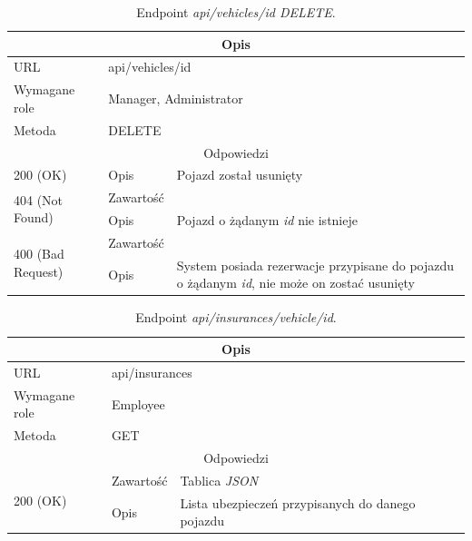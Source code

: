 \documentclass[eng,printmode,openany]{mgr}
\begin{document}
	\begin{table}[H]
		\caption{Endpoint \textit{api/vehicles/id DELETE}.}
		\begin{tabularx}{\textwidth}{|l|l|X|}
			\hline
			\multicolumn{3}{|c|}{Opis}
			\\ \hline
			URL                       & \multicolumn{2}{l|}{api/vehicles/id}
			\\ \hline
			Wymagane role             & \multicolumn{2}{l|}{Manager, Administrator}
			\\ \hline
			Metoda                    & \multicolumn{2}{l|}{DELETE}
			\\ \hline
			\multicolumn{3}{|c|}{Odpowiedzi}
			\\ \hline
			200 (OK)			                & Opis         	& Pojazd został usunięty
			\\ \hline
			\multirow{2}{*}{404 (Not Found)} 	& Zawartość     &    	
			\\ \cline{2-3}                      & Opis          & Pojazd o żądanym \textit{id} nie istnieje
			\\ \hline
			\multirow{2}{*}{400 (Bad Request)} 	& Zawartość     &    	
			\\ \cline{2-3}                      & Opis          & System posiada rezerwacje przypisane do pojazdu o żądanym \textit{id}, nie może on zostać usunięty
			\\ \hline
		\end{tabularx}
	\end{table}
	
	\begin{table}[H]
		\caption{Endpoint \textit{api/insurances/vehicle/id}.}
		\begin{tabularx}{\textwidth}{|l|l|X|}
			\hline
			\multicolumn{3}{|c|}{Opis}
			\\ \hline
			URL                         & \multicolumn{2}{l|}{api/insurances}
			\\ \hline
			Wymagane role               & \multicolumn{2}{l|}{Employee}
			\\ \hline
			Metoda                      & \multicolumn{2}{l|}{GET}
			\\ \hline
			\multicolumn{3}{|c|}{ Odpowiedzi}
			\\ \hline
			\multirow{2}{*}{200 (OK)}   & Zawartość         & Tablica \textit{JSON}
			\\ \cline{2-3}              & Opis         	    & Lista ubezpieczeń przypisanych do danego pojazdu
			\\ \hline
		\end{tabularx}
	\end{table}
	
\end{document}
